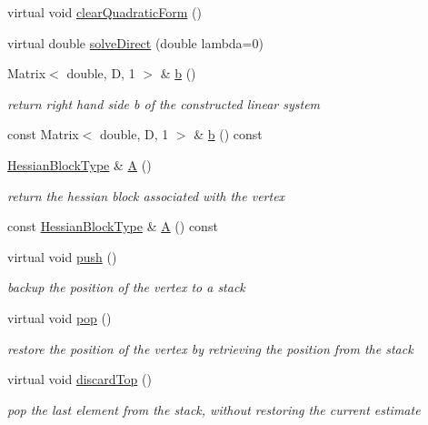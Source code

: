 \begin{DoxyCompactItemize}
virtual void \mbox{\hyperlink{classg2o_1_1_base_vertex_a144f99c7aa36a100dea65b30793e6d76}{clear\+Quadratic\+Form}} ()
\item 
virtual double \mbox{\hyperlink{classg2o_1_1_base_vertex_a0bbd9551b7e03f7e422169e396e8ec9b}{solve\+Direct}} (double lambda=0)
\item 
Matrix$<$ double, D, 1 $>$ \& \mbox{\hyperlink{classg2o_1_1_base_vertex_af7a70ede844ad023ba32edde16c8c745}{b}} ()
\begin{DoxyCompactList}\small\item\em return right hand side b of the constructed linear system \end{DoxyCompactList}\item 
const Matrix$<$ double, D, 1 $>$ \& \mbox{\hyperlink{classg2o_1_1_base_vertex_a6b0bf63c79b2b36186680b2a73ec70bf}{b}} () const
\item 
\mbox{\hyperlink{classg2o_1_1_base_vertex_a887928bc60710e0ec9acb269ee7411db}{Hessian\+Block\+Type}} \& \mbox{\hyperlink{classg2o_1_1_base_vertex_a43bcf2bb3420a0b2cb80bfd297b464a6}{A}} ()
\begin{DoxyCompactList}\small\item\em return the hessian block associated with the vertex \end{DoxyCompactList}\item 
const \mbox{\hyperlink{classg2o_1_1_base_vertex_a887928bc60710e0ec9acb269ee7411db}{Hessian\+Block\+Type}} \& \mbox{\hyperlink{classg2o_1_1_base_vertex_a3efca26127cda4f9b77a06352f1267bb}{A}} () const
\item 
virtual void \mbox{\hyperlink{classg2o_1_1_base_vertex_ae6edf93fe07aa27579a9352faa83098c}{push}} ()
\begin{DoxyCompactList}\small\item\em backup the position of the vertex to a stack \end{DoxyCompactList}\item 
virtual void \mbox{\hyperlink{classg2o_1_1_base_vertex_a502bf3db2ee32061a2c8257ef81a1552}{pop}} ()
\begin{DoxyCompactList}\small\item\em restore the position of the vertex by retrieving the position from the stack \end{DoxyCompactList}\item 
virtual void \mbox{\hyperlink{classg2o_1_1_base_vertex_a71729c4d91044bde9bfea4c859b0c02d}{discard\+Top}} ()
\begin{DoxyCompactList}\small\item\em pop the last element from the stack, without restoring the current estimate \end{DoxyCompactList}\item 

\end{DoxyCompactItemize}
